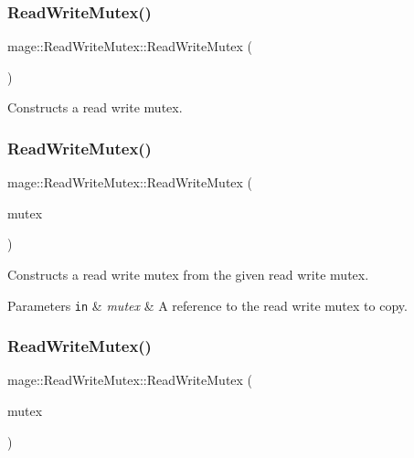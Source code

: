 \subsubsection{\texorpdfstring{Read\+Write\+Mutex()}{ReadWriteMutex()}\hspace{0.1cm}{\footnotesize\ttfamily [1/3]}}
{\footnotesize\ttfamily mage\+::\+Read\+Write\+Mutex\+::\+Read\+Write\+Mutex (\begin{DoxyParamCaption}{ }\end{DoxyParamCaption})}

Constructs a read write mutex. \hypertarget{structmage_1_1_read_write_mutex_aacb2f69e7e2b084147e1e45628e9dd67}{}\label{structmage_1_1_read_write_mutex_aacb2f69e7e2b084147e1e45628e9dd67} 
\subsubsection{\texorpdfstring{Read\+Write\+Mutex()}{ReadWriteMutex()}\hspace{0.1cm}{\footnotesize\ttfamily [2/3]}}
{\footnotesize\ttfamily mage\+::\+Read\+Write\+Mutex\+::\+Read\+Write\+Mutex (\begin{DoxyParamCaption}\item[{const \hyperlink{structmage_1_1_read_write_mutex}{Read\+Write\+Mutex} \&}]{mutex }\end{DoxyParamCaption})\hspace{0.3cm}{\ttfamily [delete]}}

Constructs a read write mutex from the given read write mutex.


\begin{DoxyParams}[1]{Parameters}
\mbox{\tt in}  & {\em mutex} & A reference to the read write mutex to copy. \\
\hline
\end{DoxyParams}
\hypertarget{structmage_1_1_read_write_mutex_a664e946edfa742dad648fc9fcb29832e}{}\label{structmage_1_1_read_write_mutex_a664e946edfa742dad648fc9fcb29832e} 
\subsubsection{\texorpdfstring{Read\+Write\+Mutex()}{ReadWriteMutex()}\hspace{0.1cm}{\footnotesize\ttfamily [3/3]}}
{\footnotesize\ttfamily mage\+::\+Read\+Write\+Mutex\+::\+Read\+Write\+Mutex (\begin{DoxyParamCaption}\item[{\hyperlink{structmage_1_1_read_write_mutex}{Read\+Write\+Mutex} \&\&}]{mutex }\end{DoxyParamCaption})\hspace{0.3cm}{\ttfamily [delete]}}


